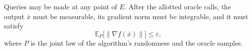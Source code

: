 \documentclass[10pt]{article}
\theoremstyle{definition}
\begin{document}
Queries may be made at any point of $E$. After the allotted oracle calls, the output $\bar{x}$ must be measurable, its gradient norm must be integrable, and it must satisfy
\[
\mathbb{E}_{P}\bigl[\|\nabla f(\bar{x})\|\bigr]\leq\varepsilon,
\]
where $P$ is the joint law of the algorithm's randomness and the oracle samples.
\end{document}
